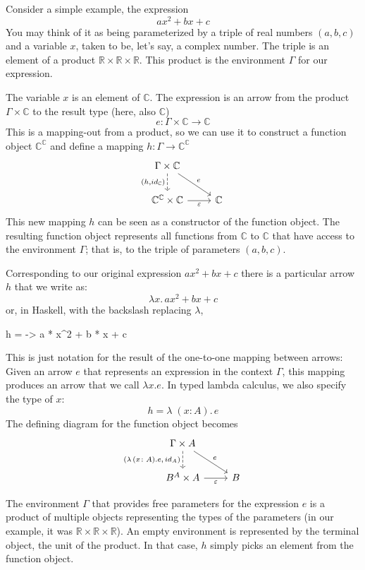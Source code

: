 \documentclass[DaoFP]{subfiles}
\begin{document}
Consider a simple example, the expression
\[a x^2 + b x + c\]
You may think of it as being parameterized by a triple of real numbers $(a, b, c)$ and a variable $x$, taken to be, let's say, a complex number. The triple is an element of a product $\mathbb{R} \times \mathbb{R} \times \mathbb{R}$. This product is the environment $\Gamma$ for our expression. 

The variable $x$ is an element of $\mathbb{C}$. The expression is an arrow from the product $\Gamma \times \mathbb{C}$ to the result type (here, also $\mathbb{C}$)
\[e \colon \Gamma \times \mathbb{C} \to \mathbb{C} \]
This is a mapping-out from a product, so we can use it to construct a function object  $\mathbb{C}^{\mathbb{C}}$ and define a mapping $h \colon \Gamma \to \mathbb{C}^{\mathbb{C}}$
\[
 \begin{tikzcd}
 \Gamma \times \mathbb{C}
 \arrow[d, dashed, "{(h, id_{\mathbb{C}})}"']
 \arrow[rd, "e"]
 \\
 \mathbb{C}^{\mathbb{C}} \times \mathbb{C}
 \arrow[r, "\varepsilon"']
& \mathbb{C}
 \end{tikzcd}
\]
This new mapping $h$ can be seen as a constructor of the function object. The resulting function object represents all functions from $\mathbb{C}$ to $\mathbb{C}$ that have access to the environment $\Gamma$; that is, to the triple of parameters $(a, b, c)$. 

Corresponding to our original expression $a x^2 + b x + c$ there is a particular arrow $h$ that we write as:
\[ \lambda x . \,a x^2 + b x + c \]
or, in Haskell, with the backslash replacing $\lambda$,
\begin{haskell}
h = \x -> a * x^2 + b * x + c
\end{haskell}

This is just notation for the result of the one-to-one mapping between arrows: Given an arrow $e$ that represents an expression in the context $\Gamma$, this mapping produces an arrow that we call $\lambda x . e$. In typed lambda calculus, we also specify the type of $x$:
\[h = \lambda\;  (x \colon A) . \, e\]
The defining diagram for the function object becomes
\[
 \begin{tikzcd}
 \Gamma \times A
 \arrow[d, dashed, "{( \lambda\,  (x \colon A) . e, \,id_A)}"']
 \arrow[rd, "e"]
 \\
 B^A \times A
 \arrow[r, "\varepsilon"']
& B
 \end{tikzcd}
\]

The environment $\Gamma$ that provides free parameters for the expression $e$ is a product of multiple objects representing the types of the parameters (in our example, it was $\mathbb{R} \times \mathbb{R} \times \mathbb{R}$). An empty environment is represented by the terminal object, the unit of the product. In that case, $h$ simply picks an element from the function object. 
\end{document}
